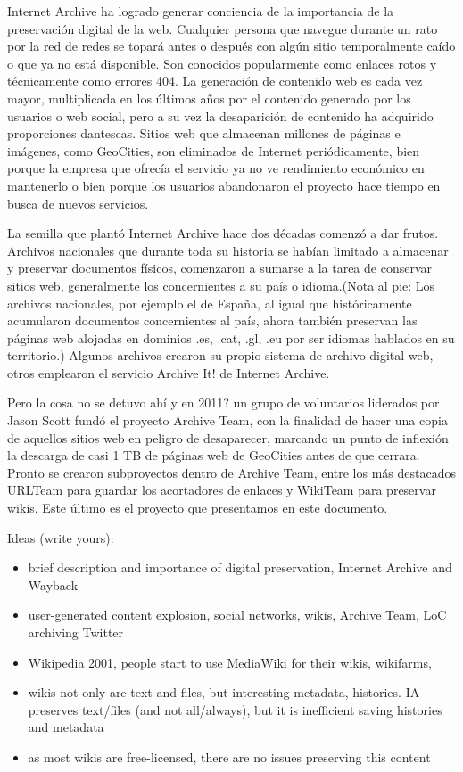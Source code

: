 \documentclass[11pt,twocolumn]{article}
\begin{document}
Internet Archive ha logrado generar conciencia de la importancia de la preservación digital de la web. Cualquier persona que navegue durante un rato por la red de redes se topará antes o después con algún sitio temporalmente caído o que ya no está disponible. Son conocidos popularmente como enlaces rotos y técnicamente como errores 404. La generación de contenido web es cada vez mayor, multiplicada en los últimos años por el contenido generado por los usuarios o web social, pero a su vez la desaparición de contenido ha adquirido proporciones dantescas. Sitios web que almacenan millones de páginas e imágenes, como GeoCities, son eliminados de Internet periódicamente, bien porque la empresa que ofrecía el servicio ya no ve rendimiento económico en mantenerlo o bien porque los usuarios abandonaron el proyecto hace tiempo en busca de nuevos servicios.

La semilla que plantó Internet Archive hace dos décadas comenzó a dar frutos. Archivos nacionales que durante toda su historia se habían limitado a almacenar y preservar documentos físicos, comenzaron a sumarse a la tarea de conservar sitios web, generalmente los concernientes a su país o idioma.(Nota al pie: Los archivos nacionales, por ejemplo el de España, al igual que históricamente  acumularon documentos concernientes al país, ahora también preservan las páginas web alojadas en dominios .es, .cat, .gl, .eu por ser idiomas hablados en su territorio.) Algunos archivos crearon su propio sistema de archivo digital web, otros emplearon el servicio Archive It! de Internet Archive.

Pero la cosa no se detuvo ahí y en 2011? un grupo de voluntarios liderados por Jason Scott fundó el proyecto Archive Team, con la finalidad de hacer una copia de aquellos sitios web en peligro de desaparecer, marcando un punto de inflexión la descarga de casi 1 TB de páginas web de GeoCities antes de que cerrara. Pronto se crearon subproyectos dentro de Archive Team, entre los más destacados URLTeam para guardar los acortadores de enlaces y WikiTeam para preservar wikis. Este último es el proyecto que presentamos en este documento.

Ideas (write yours):
\begin{itemize}
\item brief description and importance of digital preservation, Internet Archive and Wayback
\item user-generated content explosion, social networks, wikis, Archive Team, LoC archiving Twitter
\item Wikipedia 2001, people start to use MediaWiki for their wikis, wikifarms, 
\item wikis not only are text and files, but interesting metadata, histories. IA preserves text/files (and not all/always), but it is inefficient saving histories and metadata
\item as most wikis are free-licensed, there are no issues preserving this content
\end{itemize}
\end{document}
